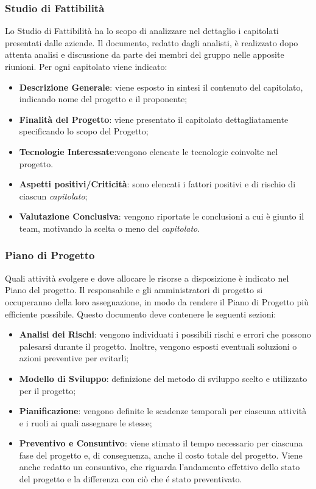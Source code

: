 \subsubsection{Studio di Fattibilità}
Lo Studio di Fattibilità ha lo scopo di analizzare nel dettaglio i capitolati presentati dalle aziende. Il documento,  redatto dagli analisti, è realizzato dopo attenta analisi e discussione da parte dei membri del gruppo nelle apposite riunioni. Per ogni capitolato viene indicato:
\begin{itemize}
  \item \textbf{Descrizione Generale}: viene esposto in sintesi il contenuto del capitolato, indicando nome del progetto e il proponente;
  \item \textbf{Finalità del Progetto}: viene presentato il capitolato dettagliatamente specificando lo scopo del Progetto;
  \item \textbf{Tecnologie Interessate}:vengono elencate le tecnologie coinvolte nel progetto.
  \item \textbf{Aspetti positivi/Criticità}: sono elencati i fattori positivi e di rischio di ciascun \textit{capitolato\glos};
  \item \textbf{Valutazione Conclusiva}: vengono riportate le conclusioni a cui è giunto il team, motivando la scelta o meno del \textit{capitolato\glos}.
\end{itemize}
\subsubsection{Piano di Progetto}
Quali attività svolgere e dove allocare le risorse a disposizione è indicato nel Piano del progetto. Il responsabile e gli amministratori di progetto si occuperanno della loro assegnazione, in modo da rendere il Piano di Progetto più efficiente possibile. Questo documento deve contenere le seguenti sezioni:
\begin{itemize}
  \item \textbf{Analisi dei Rischi}: vengono individuati i possibili rischi e errori che possono palesarsi durante il progetto. Inoltre, vengono esposti eventuali soluzioni o azioni preventive per evitarli;
  \item \textbf{Modello di Sviluppo}: definizione del metodo di sviluppo scelto e utilizzato per il progetto;
  \item \textbf{Pianificazione}: vengono definite le scadenze temporali per ciascuna attività e i ruoli ai quali assegnare le stesse;
  \item \textbf{Preventivo e Consuntivo}: viene stimato il tempo necessario per ciascuna fase del progetto e, di conseguenza, anche il costo totale del progetto. Viene anche redatto un consuntivo, che riguarda l'andamento effettivo dello stato del progetto e la differenza con ciò che é stato preventivato.
\end{itemize}
